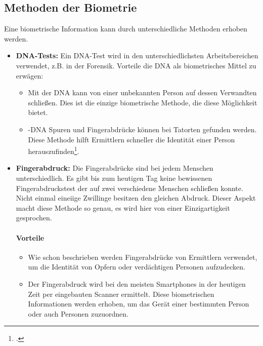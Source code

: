 \subsection{Methoden der Biometrie}
Eine biometrische Information kann durch unterschiedliche Methoden erhoben werden.
\begin{itemize}
	\item \textbf{DNA-Tests:} Ein DNA-Test wird in den unterschiedlichsten Arbeitsbereichen verwendet, z.B. in der Forensik.
	Vorteile die DNA als biometrisches Mittel zu erwägen:
	\begin{itemize}
		\item Mit der DNA kann von einer unbekannten Person auf dessen Verwandten schließen. Dies ist die einzige biometrische Methode, die diese Möglichkeit bietet.
		\item-DNA Spuren und Fingerabdrücke können bei Tatorten gefunden werden. Diese Methode hilft Ermittlern schneller die Identität einer Person herauszufinden\footcite{dna-test}.
	\end{itemize}
	\item \textbf{Fingerabdruck:} Die Fingerabdrücke sind bei jedem Menschen unterschiedlich. 
	Es gibt bis zum heutigen Tag keine bewissenen Fingerabdruckstest der auf zwei verschiedene Menschen schließen konnte. 
	Nicht einmal eineiige Zwillinge besitzen den gleichen Abdruck.
	Dieser Aspekt macht diese Methode so genau, es wird hier von einer Einzigartigkeit gesprochen.
	\paragraph{Vorteile}
	\begin{itemize}
		\item Wie schon beschrieben werden Fingerabdrücke von Ermittlern verwendet, um die Identität von Opfern oder verdächtigen Personen aufzudecken.
		\item Der Fingerabdruck wird bei den meisten Smartphones in der heutigen Zeit per eingebauten Scanner ermittelt. Diese biometrischen Informationen werden erhoben, um das Gerät einer bestimmten Person oder auch Personen zuzuordnen.
	\end{itemize}

\end{itemize}
